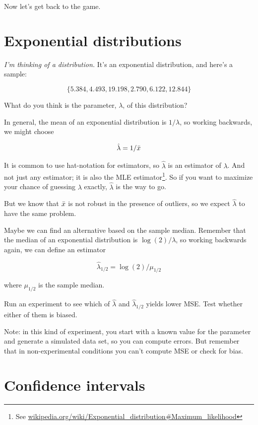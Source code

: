 \documentclass[12pt]{book}
\begin{document}
Now let's get back to the game.


\section{Exponential distributions}

{\em I'm thinking of a distribution.}  It's an exponential distribution, and 
here's a sample:

\[ \{ 5.384, 4.493, 19.198, 2.790, 6.122, 12.844 \} \]

What do you think is the parameter, $\lambda$, of this distribution?

\newcommand{\lamhat}{\hat{\lambda}}
\newcommand{\lamhatmed}{\hat{\lambda}_{1/2}}

In general, the mean of an exponential distribution is $1 / \lambda$,
so working backwards, we might choose

\[ \lamhat = 1 / \xbar \]

It is common to use hat-notation for estimators, so $\lamhat$ is an
estimator of $\lambda$.  And not just any estimator; it is also the
MLE estimator\footnote{See
\url{wikipedia.org/wiki/Exponential_distribution#Maximum_likelihood}}.
So if you want to maximize your chance of guessing $\lambda$ exactly,
$\lamhat$ is the way to go.

But we know that $\bar{x}$ is not robust in the presence of outliers, so
we expect $\lamhat$ to have the same problem.

Maybe we can find an alternative based on the sample median.  Remember
that the median of an exponential distribution is $\log(2) / \lambda$,
so working backwards again, we can define an estimator

\[ \lamhatmed = \log(2) / \mu_{1/2} \]

where $\mu_{1/2}$ is the sample median.

\begin{ex}

Run an experiment to see which of $\lamhat$ and $\lamhatmed$ yields
lower MSE.  Test whether either of them is biased.

Note: in this kind of experiment, you start with a known value for
the parameter and generate a simulated data set, so you can compute
errors.  But remember that in non-experimental conditions you can't
compute MSE or check for bias.

\end{ex}


\section{Confidence intervals}
\end{document}
